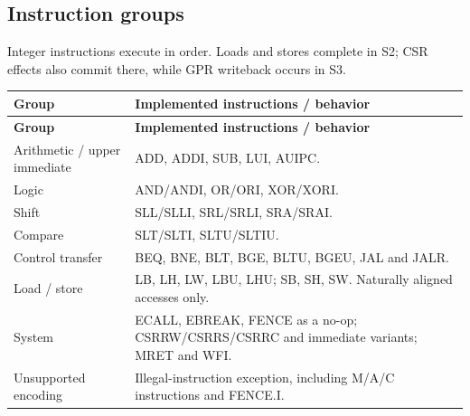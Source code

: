\documentclass[11pt]{article}
\begin{document}
\subsection{Instruction groups}
\noindent Integer instructions execute in order. Loads and stores complete in S2; CSR effects also commit there, while GPR writeback occurs in S3.\par\medskip
{\small
\begin{longtable}{@{}L{0.2800\dimexpr\linewidth-12pt\relax}L{0.7200\dimexpr\linewidth-12pt\relax}@{}}
\toprule
\textbf{Group} & \textbf{Implemented instructions / behavior} \\ \midrule
\endfirsthead
\toprule
\textbf{Group} & \textbf{Implemented instructions / behavior} \\ \midrule
\endhead
Arithmetic / upper immediate & ADD, ADDI, SUB, LUI, AUIPC. \\ \addlinespace[3pt]
Logic & AND/ANDI, OR/ORI, XOR/XORI. \\ \addlinespace[3pt]
Shift & SLL/SLLI, SRL/SRLI, SRA/SRAI. \\ \addlinespace[3pt]
Compare & SLT/SLTI, SLTU/SLTIU. \\ \addlinespace[3pt]
Control transfer & BEQ, BNE, BLT, BGE, BLTU, BGEU, JAL and JALR. \\ \addlinespace[3pt]
Load / store & LB, LH, LW, LBU, LHU; SB, SH, SW. Naturally aligned accesses only. \\ \addlinespace[3pt]
System & ECALL, EBREAK, FENCE as a no-op; CSRRW/CSRRS/CSRRC and immediate variants; MRET and WFI. \\ \addlinespace[3pt]
Unsupported encoding & Illegal-instruction exception, including M/A/C instructions and FENCE.I. \\*
\bottomrule\end{longtable}}

\end{document}
